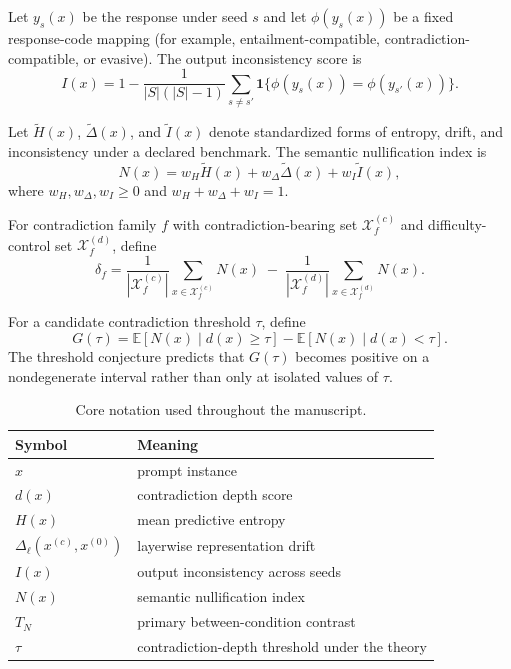 \documentclass{svjour3}
\begin{document}
\begin{definition}
Let $y_s(x)$ be the response under seed $s$ and let $\phi(y_s(x))$ be a fixed response-code mapping (for example, entailment-compatible, contradiction-compatible, or evasive). The output inconsistency score is
\[
I(x)=1-\frac{1}{|S|(|S|-1)}\sum_{s\neq s'} \mathbf{1}\{\phi(y_s(x))=\phi(y_{s'}(x))\}.
\]
\end{definition}

\begin{definition}
Let $\widetilde{H}(x)$, $\widetilde{\Delta}(x)$, and $\widetilde{I}(x)$ denote standardized forms of entropy, drift, and inconsistency under a declared benchmark. The semantic nullification index is
\[
N(x)=w_H\widetilde{H}(x)+w_\Delta\widetilde{\Delta}(x)+w_I\widetilde{I}(x),
\]
where $w_H,w_\Delta,w_I\ge 0$ and $w_H+w_\Delta+w_I=1$.
\end{definition}

\begin{definition}
For contradiction family $f$ with contradiction-bearing set $\mathcal{X}^{(c)}_f$ and difficulty-control set $\mathcal{X}^{(d)}_f$, define
\[
\delta_f=
\frac{1}{|\mathcal{X}^{(c)}_f|}\sum_{x\in\mathcal{X}^{(c)}_f}N(x)
\;-\;
\frac{1}{|\mathcal{X}^{(d)}_f|}\sum_{x\in\mathcal{X}^{(d)}_f}N(x).
\]
\end{definition}

\begin{definition}
For a candidate contradiction threshold $\tau$, define
\[
G(\tau)=
\mathbb{E}[N(x)\mid d(x)\ge \tau]
-
\mathbb{E}[N(x)\mid d(x)<\tau].
\]
The threshold conjecture predicts that $G(\tau)$ becomes positive on a nondegenerate interval rather than only at isolated values of $\tau$.
\end{definition}

\begin{table}[t]
\centering
\small
\caption{Core notation used throughout the manuscript.}
\label{tab:hp-notation}
\begin{tabular}{ll}
\toprule
Symbol & Meaning \\
\midrule
$x$ & prompt instance \\
$d(x)$ & contradiction depth score \\
$H(x)$ & mean predictive entropy \\
$\Delta_\ell(x^{(c)},x^{(0)})$ & layerwise representation drift \\
$I(x)$ & output inconsistency across seeds \\
$N(x)$ & semantic nullification index \\
$T_N$ & primary between-condition contrast \\
$\tau$ & contradiction-depth threshold under the theory \\
\bottomrule
\end{tabular}
\end{table}
\end{document}
